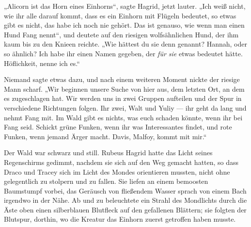 „Alicorn ist das Horn eines Einhorns“, sagte Hagrid, jetzt lauter.
„Ich weiß nicht, wie ihr alle darauf kommt, dass es ein Einhorn mit Flügeln bedeutet, so etwas gibt es nicht, das habe ich noch nie gehört. Das ist genauso, wie wenn man einen Hund Fang nennt“, und deutete auf den riesigen wolfsähnlichen Hund, der ihm kaum bis zu den Knieen reichte.
„Wie hättest du sie denn genannt? Hannah, oder so ähnlich? Ich habe ihr einen Namen gegeben, der \emph{für sie} etwas bedeutet hätte. Höflichkeit, nenne ich es.“

Niemand sagte etwas dazu, und nach einem weiteren Moment nickte der riesige Mann scharf.
„Wir beginnen unsere Suche von hier aus, dem letzten Ort, an dem es zugeschlagen hat. Wir werden uns in zwei Gruppen aufteilen und der Spur in verschiedene Richtungen folgen. Ihr zwei, Walt und Yuliy — ihr geht da lang und nehmt Fang mit. Im Wald gibt es nichts, was euch schaden könnte, wenn ihr bei Fang seid. Schickt grüne Funken, wenn ihr was Interessantes findet, und rote Funken, wenn jemand Ärger macht. Davis, Malfoy, kommt mit mir.“

Der Wald war schwarz und still. Rubeus Hagrid hatte das Licht seines Regenschirms gedimmt, nachdem sie sich auf den Weg gemacht hatten, so dass Draco und Tracey sich im Licht des Mondes orientieren mussten, nicht ohne gelegentlich zu stolpern und zu fallen. Sie liefen an einem bemoosten Baumstumpf vorbei, das Geräusch von fließendem Wasser sprach von einem Bach irgendwo in der Nähe. Ab und zu beleuchtete ein Strahl des Mondlichts durch die Äste oben einen silberblauen Blutfleck auf den gefallenen Blättern; sie folgten der Blutspur, dorthin, wo die Kreatur das Einhorn zuerst getroffen haben musste.

